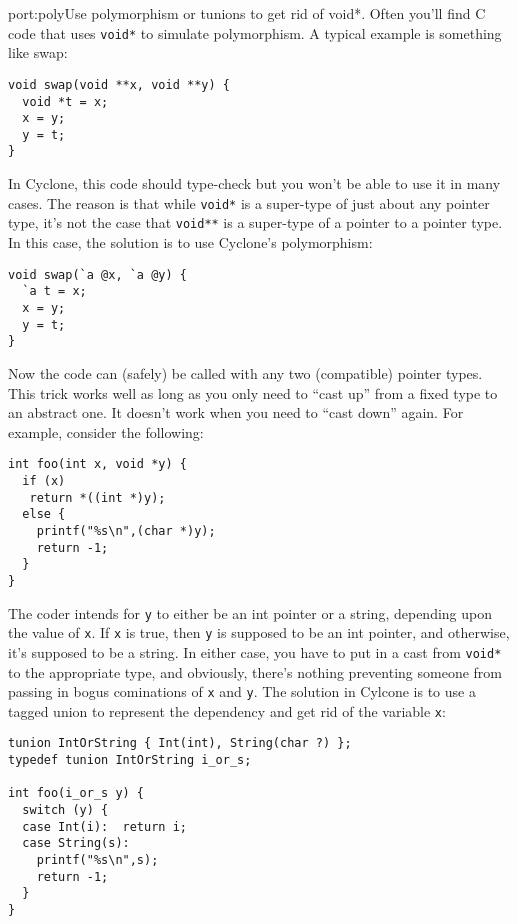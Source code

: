 \begin{porta}{port:poly}{Use polymorphism or tunions to get rid of void*.}  
Often you'll find C code that uses \texttt{void*} to simulate
polymorphism.  A typical example is something like swap:
\begin{verbatim}
void swap(void **x, void **y) {
  void *t = x;
  x = y;
  y = t;
}
\end{verbatim}
In Cyclone, this code should type-check but you won't be able
to use it in many cases.  The reason is that while \texttt{void*}
is a super-type of just about any pointer type, it's not the
case that \texttt{void**} is a super-type of a pointer to a
pointer type.  In this case, the solution is to use Cyclone's
polymorphism:
\begin{verbatim}
void swap(`a @x, `a @y) {
  `a t = x;
  x = y;
  y = t;
}
\end{verbatim}
Now the code can (safely) be called with any two (compatible)
pointer types.  This trick works well as long as you only need
to ``cast up'' from a fixed type to an abstract one.  It doesn't
work when you need to ``cast down'' again.  For example, consider
the following:
\begin{verbatim}
int foo(int x, void *y) {
  if (x)
   return *((int *)y);
  else {
    printf("%s\n",(char *)y);
    return -1;
  }
}
\end{verbatim}
The coder intends for \texttt{y} to either be an int pointer or
a string, depending upon the value of \texttt{x}.  If \texttt{x}
is true, then \texttt{y} is supposed to be an int pointer, and
otherwise, it's supposed to be a string.  In either case, you have
to put in a cast from \texttt{void*} to the appropriate type,
and obviously, there's nothing preventing someone from passing
in bogus cominations of \texttt{x} and \texttt{y}.  The solution
in Cylcone is to use a tagged union to represent the dependency
and get rid of the variable \texttt{x}:
\begin{verbatim}
tunion IntOrString { Int(int), String(char ?) };
typedef tunion IntOrString i_or_s;

int foo(i_or_s y) {
  switch (y) {
  case Int(i):  return i;
  case String(s):  
    printf("%s\n",s);
    return -1;
  }
}
\end{verbatim}
\end{porta}

